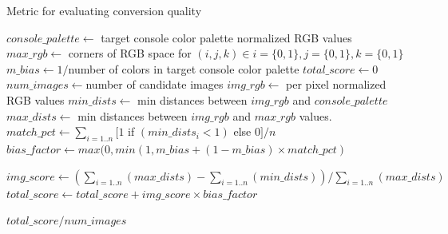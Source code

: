\documentclass[10pt,twocolumn,letterpaper]{article}
\begin{document}
\begin{algorithm*}
   \caption{Metric for evaluating conversion quality}
   \begin{algorithmic}
      \label{alg:alg1}

      \STATE $console\_palette \leftarrow$ target console color palette normalized RGB values
      \STATE $max\_rgb \leftarrow$ corners of RGB space for $(i, j, k) \in i=\{0,1\}, j=\{0,1\}, k=\{0,1\}$
      \STATE $m\_bias \leftarrow 1 / $number of colors in target console color palette
      \STATE $total\_score \leftarrow 0$
      \STATE $num\_images \leftarrow $number of candidate images
      \STATE
      \STATE $img\_rgb \leftarrow $ per pixel normalized RGB values
      \STATE $min\_dists \leftarrow $ min distances between $img\_rgb$ and $console\_palette$
      \STATE $max\_dists \leftarrow $ min distances between $img\_rgb$ and $max\_rgb$ values.
      \STATE $match\_pct \leftarrow \sum_{i=1..n}[ 1 $ if $(min\_dists_i < 1)$ else $0] / n$
      \STATE $bias\_factor \leftarrow max(0, min(1, m\_bias + (1 - m\_bias) \times match\_pct)$

      \STATE $img\_score \leftarrow (\sum_{i=1..n}(max\_dists) - \sum_{i=1..n}(min\_dists)) / \sum_{i=1..n}(max\_dists)$
      \STATE $total\_score \leftarrow total\_score + img\_score \times bias\_factor$

      \ENDFOR

      \RETURN $total\_score/num\_images$

   \end{algorithmic}
\end{algorithm*}

{\small


}
\end{document}
